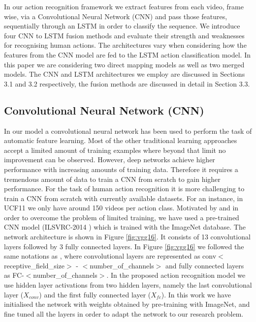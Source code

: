 \documentclass[10pt,twocolumn,letterpaper]{article}
\begin{document}
 In our action recognition framework we extract features from each video, frame wise, via a Convolutional Neural Network (CNN) and pass those features, sequentially through an LSTM in order to classify the sequence. We introduce four CNN to LSTM fusion methods and evaluate their strength and weaknesses for recognising human actions. The architectures vary when considering how the features from the CNN model are fed to the LSTM action classification model. In this paper we are considering two direct mapping models as well as two merged models. The CNN and LSTM architectures we employ are discussed in Sections 3.1 and 3.2 respectively, the fusion methods are discussed in detail in Section 3.3.
   
\subsection{Convolutional Neural Network (CNN)}

   In our model a convolutional neural network has been used to perform the task of automatic feature learning. Most of the other traditional learning approaches accept a limited amount of training examples where beyond that limit no improvement can be observed. However, deep networks achieve higher performance with increasing amounts of training data. Therefore it requires a tremendous amount of data to train a CNN from scratch to gain higher performance. For the task of human action recognition it is more challenging to train a CNN from scratch with currently available datasets. For an instance, in UCF11 we only have around 150 videos per action class. Motivated by \cite{Simonyan2014} and in order to overcome the problem of limited training, we have used a pre-trained CNN model (ILSVRC-2014 \cite{VGG16}) which is trained with the ImageNet database. The network architecture is shown in Figure \ref{fig:vgg16}. It consists of 13 convolutional layers followed by 3 fully connected layers. In Figure \ref{fig:vgg16} we followed the same notations as \cite{VGG16} , where convolutional layers are represented as conv$<$receptive\_field\_size$>$ - $<$number\_of\_channels$>$ and  fully connected layers as FC-$<$number\_of\_channels$>$.  In the proposed action recognition model we use hidden layer activations from two hidden layers, namely the last convolutional layer ($X_{conv}$) and the first fully connected layer ($X_{fc}$). In this work we have initialised the network with weights obtained by pre-training with ImageNet, and fine tuned all the layers in order to adapt the network to our research problem. 
   
\end{document}
